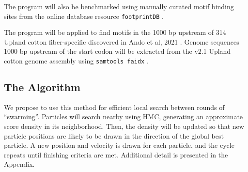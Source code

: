 \documentclass{article}
\begin{document}
  The program will also be benchmarked using manually curated motif binding sites from the online database resource \texttt{footprintDB} \cite{sebastian2014footprintdb}.  

  The program will be applied to find motifs in the 1000 bp upstream of 314 Upland cotton fiber-specific discovered in Ando et al, 2021 \cite{ando2021lcm}. Genome sequences 1000 bp upstream of the start codon will be extracted from the v2.1 Upland cotton genome assembly \cite{chen2020genomic} using \texttt{samtools faidx} \cite{li2009sequence}.
\subsection{The Algorithm}
  We propose to use this method for efficient local search between rounds of ``swarming''. Particles will search nearby using HMC, generating an approximate score density in its neighborhood. Then, the density will be updated so that new particle positions are likely to be drawn in the direction of the global best particle. A new position and velocity is drawn for each particle, and the cycle repeats until finishing criteria are met. Additional detail is presented in the Appendix.
\end{document}

